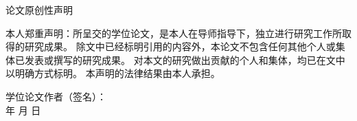 %
%

\newpage
\vspace*{20pt}
\begin{center}{\heiti 论文原创性声明}\end{center}
\par\vspace*{30pt}
\renewcommand{\baselinestretch}{2}
{ \songti %
本人郑重声明：所呈交的学位论文，是本人在导师指导下，独立进行研究工作所取得的研究成果。
除文中已经标明引用的内容外，本论文不包含任何其他个人或集体已发表或撰写的研究成果。
对本文的研究做出贡献的个人和集体，均已在文中以明确方式标明。
本声明的法律结果由本人承担。

\vskip2cm

\hspace*{4cm}学位论文作者（签名）：\hspace{4cm} \hfill \\[1cm]
\hspace*{10cm}年 \hfill  月 \hfill 日\hspace{1cm}\hfill\par}

  \iflib
  \else
  \newpage
  \cleardoublepage
  \fi
\renewcommand{\baselinestretch}{1.5}
\small\normalsize
